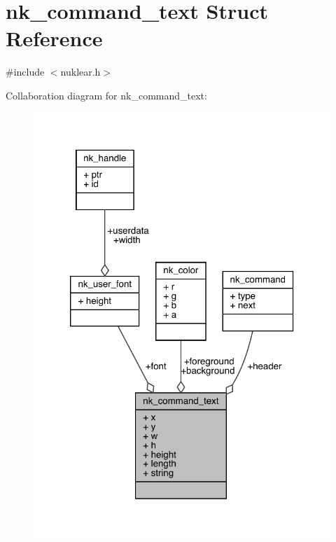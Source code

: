 \hypertarget{structnk__command__text}{}\section{nk\+\_\+command\+\_\+text Struct Reference}
\label{structnk__command__text}


{\ttfamily \#include $<$nuklear.\+h$>$}



Collaboration diagram for nk\+\_\+command\+\_\+text\+:
\nopagebreak
\begin{figure}[H]
\begin{center}
\leavevmode
\includegraphics[width=320pt]{structnk__command__text__coll__graph}
\end{center}
\end{figure}
